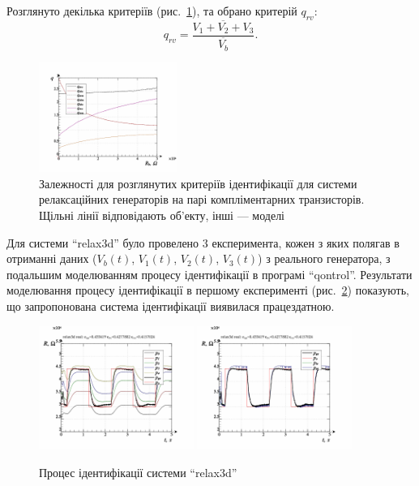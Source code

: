 \documentclass[a4paper,13pt]{atuaref}
\begin{document}
Розглянуто декілька критеріїв (рис.~\ref{atu:f:relax3d_q}), та обрано критерій $q_{rv}$:
%
\begin{equation}
  q_{rv} = \frac{\overline{V_1+V_2+V_3}}{\overline{V_b}}.
  \label{atu:eq:q_rv_relax}
\end{equation}

\begin{figure}[htb!]
  \centerline{\includegraphics[width=0.40\textwidth]{p7/p/relax3d_read_q-p_q1.png} }
  \caption{Залежності для розглянутих критеріїв ідентифікації для системи
  релаксаційних генераторів на парі компліментарних транзисторів.
  Щільні лінії відповідають об'екту, інші --- моделі}
  \label{atu:f:relax3d_q}
\end{figure}

Для системи ``relax3d'' було провелено 3 експеримента, кожен з яких полягав в отриманні даних
($ V_b (t) $, $ V_1 (t) $, $ V_2 (t) $, $ V_3(t) $) з реального генератора, з подальшим моделюванням процесу ідентифікації в
програмі ``qontrol''.
Результати моделювання процесу ідентифікації в першому експерименті
(рис.~\ref{atu:f:relax3d_id_1}) показують, що запропонована система
ідентифікації виявилася працездатною.

\begin{figure}[htb!]
  \centerline{
    \includegraphics[width=0.45\textwidth]{p7/p/relax3d_read_id2-p_p_00.png}
    \hfill
    \includegraphics[width=0.45\textwidth]{p7/p/relax3d_read_id2-p_pp_00.png}
  }
  \caption{Процес ідентифікації системи ``relax3d''}
  \label{atu:f:relax3d_id_1}
\end{figure}
\end{document}
